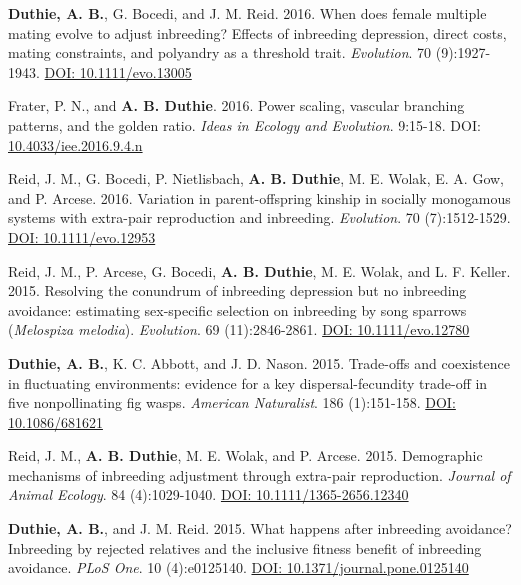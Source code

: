 \documentclass[letterpaper]{article}
\begin{document}
\begin{etaremune}
\item {\bf Duthie, A. B.}, G. Bocedi, and J. M. Reid. 2016. When does female multiple mating evolve to adjust inbreeding? Effects of inbreeding depression, direct costs, mating constraints, and polyandry as a threshold trait. {\it Evolution}. 70 (9):1927-1943. \href{http://onlinelibrary.wiley.com/doi/10.1111/evo.13005/abstract}{DOI: 10.1111/evo.13005}
\item Frater, P. N., and {\bf A. B. Duthie}. 2016. Power scaling, vascular branching patterns, and the golden ratio. {\it Ideas in Ecology and Evolution}. 9:15-18. DOI: \href{http://ojs.library.queensu.ca/index.php/IEE/article/view/6312}{10.4033/iee.2016.9.4.n}
\item Reid, J. M., G. Bocedi, P. Nietlisbach, {\bf A. B. Duthie}, M. E. Wolak, E. A. Gow, and P. Arcese. 2016. Variation in parent-offspring kinship in socially monogamous systems with extra-pair reproduction and inbreeding. {\it Evolution}. 70 (7):1512-1529. \href{http://onlinelibrary.wiley.com/doi/10.1111/evo.12953/abstract}{DOI: 10.1111/evo.12953}
\item Reid, J. M., P. Arcese, G. Bocedi, {\bf A. B. Duthie}, M. E. Wolak, and L. F. Keller. 2015. Resolving the conundrum of inbreeding depression but no inbreeding avoidance: estimating sex-specific selection on inbreeding by song sparrows ({\it Melospiza melodia}). {\it Evolution}. 69 (11):2846-2861. \href{http://onlinelibrary.wiley.com/doi/10.1111/evo.12780/abstract}{DOI: 10.1111/evo.12780}
\item {\bf Duthie, A. B.}, K. C. Abbott, and J. D. Nason. 2015. Trade-offs and coexistence in fluctuating environments: evidence for a key dispersal-fecundity trade-off in five nonpollinating fig wasps. {\it American Naturalist}. 186 (1):151-158. \href{http://www.jstor.org/stable/10.1086/681621}{DOI: 10.1086/681621}
\item Reid, J. M., {\bf A. B. Duthie}, M. E. Wolak, and P. Arcese. 2015. Demographic mechanisms of inbreeding adjustment through extra-pair reproduction. {\it Journal of Animal Ecology}. 84 (4):1029-1040. \href{http://onlinelibrary.wiley.com/doi/10.1111/1365-2656.12340/abstract}{DOI: 10.1111/1365-2656.12340}
\item {\bf Duthie, A. B.}, and J. M. Reid. 2015. What happens after inbreeding avoidance? Inbreeding by rejected relatives and the inclusive fitness benefit of inbreeding avoidance. {\it PLoS One}. 10 (4):e0125140. \href{http://journals.plos.org/plosone/article?id=10.1371/journal.pone.0125140}{DOI: 10.1371/journal.pone.0125140}

\end{etaremune}
\end{document}
